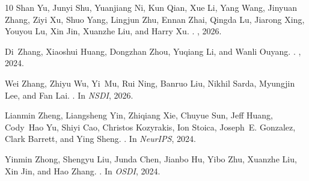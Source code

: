 \begin{thebibliography}{10}
Shan Yu, Junyi Shu, Yuanjiang Ni, Kun Qian, Xue Li, Yang Wang, Jinyuan Zhang,
  Ziyi Xu, Shuo Yang, Lingjun Zhu, Ennan Zhai, Qingda Lu, Jiarong Xing, Youyou
  Lu, Xin Jin, Xuanzhe Liu, and Harry Xu.
.
, 2026.

Di~Zhang, Xiaoshui Huang, Dongzhan Zhou, Yuqiang Li, and Wanli Ouyang.
.
, 2024.

Wei Zhang, Zhiyu Wu, Yi~Mu, Rui Ning, Banruo Liu, Nikhil Sarda, Myungjin Lee,
  and Fan Lai.
.
\newblock In {\em NSDI}, 2026.

Lianmin Zheng, Liangsheng Yin, Zhiqiang Xie, Chuyue Sun, Jeff Huang, Cody~Hao
  Yu, Shiyi Cao, Christos Kozyrakis, Ion Stoica, Joseph~E. Gonzalez, Clark
  Barrett, and Ying Sheng.
.
\newblock In {\em NeurIPS}, 2024.

Yinmin Zhong, Shengyu Liu, Junda Chen, Jianbo Hu, Yibo Zhu, Xuanzhe Liu, Xin
  Jin, and Hao Zhang.
.
\newblock In {\em OSDI}, 2024.

\end{thebibliography}
